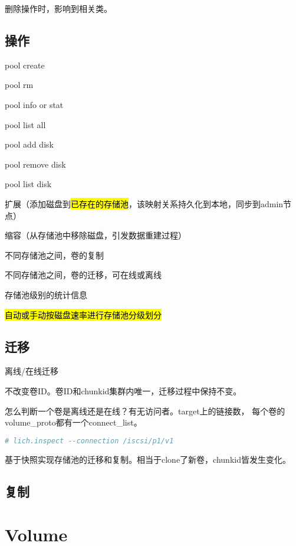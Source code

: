 删除操作时，影响到相关类。

\section{操作}

\begin{enumbox}
\item pool create
\item pool rm
\item pool info or stat
\item pool list all
\item pool add disk
\item pool remove disk
\item pool list disk
\item 扩展（添加磁盘到\hl{已存在的存储池}，该映射关系持久化到本地，同步到admin节点）
\item 缩容（从存储池中移除磁盘，引发数据重建过程）
\item 不同存储池之间，卷的复制
\item 不同存储池之间，卷的迁移，可在线或离线
\item 存储池级别的统计信息
\item \hl{自动或手动按磁盘速率进行存储池分级划分}
\end{enumbox}

\section{迁移}

离线/在线迁移

不改变卷ID。卷ID和chunkid集群内唯一，迁移过程中保持不变。

怎么判断一个卷是离线还是在线？有无访问者。target上的链接数，
每个卷的volume\_proto都有一个connect\_list。

\begin{lstlisting}[language=bash,frame=single]
# lich.inspect --connection /iscsi/p1/v1
\end{lstlisting}

基于快照实现存储池的迁移和复制。相当于clone了新卷，chunkid皆发生变化。

\section{复制}

\chapter{Volume}

